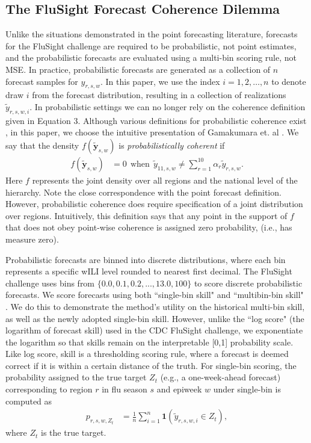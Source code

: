 \documentclass{umassthesis}          %
\begin{document}
   



\subsection{The FluSight Forecast Coherence Dilemma}
   
 Unlike the situations demonstrated in the point forecasting literature, forecasts for the FluSight challenge are required to be probabilistic, not point estimates, and the probabilistic forecasts are evaluated using a multi-bin scoring rule, not MSE. In practice, probabilistic forecasts are generated as a collection of $n$ forecast samples for $y_{r,s,w}$. In this paper, we use the index $i = 1,2,\ldots,n$ to denote draw $i$ from the forecast distribution, resulting in a collection of realizations $\tilde{y}_{r,s,w,i}$. In probabilistic settings we can no longer rely on the coherence definition given in Equation 3. Although various definitions for probabilistic coherence exist \cite{prob_coherence}\cite{taieb2017coherent}, in this paper, we choose the intuitive presentation of Gamakumara et. al \cite{prob_coherence}. We say that the density $f(\tilde{\bm{y}}_{s,w})$ is \emph{probabilistically coherent} if
\begin{align}
f(\bm{\tilde{y}}_{s,w}) &=  0 \  \ \text{when} \  \  \tilde{y}_{11,s,w} \neq \sum_{r=1}^{10} \alpha_r \tilde{y}_{r,s,w}.
\end{align}Here $f$ represents the joint density over all regions and the national level of the hierarchy. Note the close correspondence with the point forecast definition. However, probabilistic coherence does require specification of a joint distribution over regions. Intuitively, this definition says that any point in the support of $f$ that does not obey point-wise coherence is assigned zero probability, (i.e., has measure zero).

Probabilistic forecasts are binned into discrete distributions, where each bin represents a specific wILI level rounded to nearest first decimal. The FluSight challenge uses bins from $\{0.0,0.1,0.2,...,13.0,100\}$ to score discrete probabilistic forecasts. We score forecasts using both ``single-bin skill" and ``multibin-bin skill" \cite{bracher2019multibin} \cite{reich2019reply}. We do this to demonstrate the method's utility on the historical multi-bin skill, as well as the newly adopted single-bin skill. However, unlike the ``log score" (the logarithm of forecast skill) used in the CDC FluSight challenge, we exponentiate the logarithm so that skills remain on the interpretable [0,1] probability scale. Like log score, skill is a thresholding scoring rule, where a forecast is deemed correct if it is within a certain distance of the truth. For single-bin scoring, the probability assigned to the true target $Z_t$ (e.g., a one-week-ahead forecast) corresponding to region $r$ in flu season $s$ and epiweek $w$ under single-bin is computed as
\begin{align}
p_{r,s,w,Z_t} &= \frac{1}{n} \sum_{i=1}^n \bm{1}(\tilde{y}_{r,s,w,i} \in  Z_t),
\end{align}
\noindent where $Z_t$ is the true target. 
\end{document}
